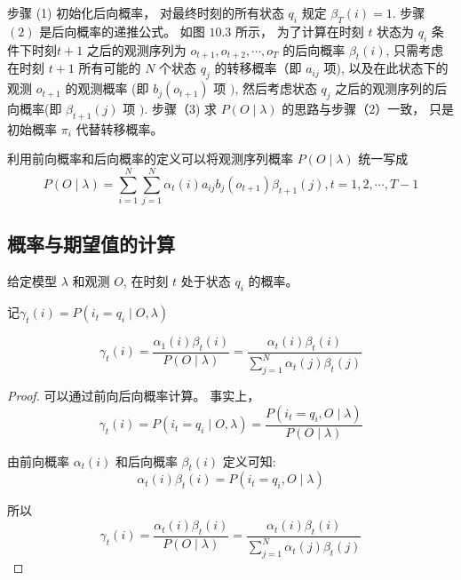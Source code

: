 步骤 (1) 初始化后向概率， 对最终时刻的所有状态 $ q_{i} $ 规定 $ \beta_{T}(i)=1 $. 步骤 $ (2) $ 是后向概率的递推公式。 如图 $ 10.3 $ 所示， 为了计算在时刻 $ t $ 状态为 $ q_{i} $ 条件下时刻$ t+1 $ 之后的观测序列为 $ o_{t+1}, o_{t+2}, \cdots, o_{T} $ 的后向概率 $ \beta_{t}(i) $, 只需考虑在时刻 $ t+1 $ 所有可能的 $ N $ 个状态 $ q_{j} $ 的转移概率（即 $ a_{i j} $ 项), 以及在此状态下的观测 $ o_{t+1} $ 的观测概率 (即 $ b_{j}\left(o_{t+1}\right) $ 项 $ ) $, 然后考虑状态 $ q_{j} $ 之后的观测序列的后向概率(即 $ \beta_{t+1}(j) $ 项 $ ) $. 步骤（3) 求 $ P(O \mid \lambda) $ 的思路与步骤（2）一致， 只是初始概率 $ \pi_{i} $ 代替转移概率。

利用前向概率和后向概率的定义可以将观测序列概率 $ P(O \mid \lambda) $ 统一写成
\begin{equation}
P(O \mid \lambda)=\sum_{i=1}^{N} \sum_{j=1}^{N} \alpha_{t}(i) a_{i j} b_{j}\left(o_{t+1}\right) \beta_{t+1}(j), t=1,2, \cdots, T-1
\end{equation}

\subsection{概率与期望值的计算}

\begin{theorem}
    \label{Thm:ComputeGamma}
    给定模型 $ \lambda $ 和观测 $ O $, 在时刻 $ t $ 处于状态 $ q_{i} $ 的概率。 
    
    记$ \gamma_{t}(i)=P\left(i_{t}=q_{i} \mid O, \lambda\right) $

\begin{equation} \gamma_{t}(i)=\frac{\alpha_{1}(i) \beta_{t}(i)}{P(O \mid \lambda)}=\frac{\alpha_{t}(i) \beta_{t}(i)}{\sum_{j=1}^{N} \alpha_{t}(j) \beta_{t}(j)} \end{equation}
\end{theorem}


\begin{proof}
    可以通过前向后向概率计算。 事实上，
\begin{equation}
\gamma_{t}(i)=P\left(i_{t}=q_{i} \mid O, \lambda\right)=\frac{P\left(i_{t}=q_{i}, O \mid \lambda\right)}{P(O \mid \lambda)}
\end{equation}

由前向概率 $ \alpha_{t}(i) $ 和后向概率 $ \beta_{t}(i) $ 定义可知:
\begin{equation}
\alpha_{t}(i) \beta_{t}(i)=P\left(i_{t}=q_{i}, O \mid \lambda\right)
\end{equation}

所以
\begin{equation} \gamma_{t}(i)=\frac{\alpha_{t}(i) \beta_{t}(i)}{P(O \mid \lambda)}=\frac{\alpha_{t}(i) \beta_{t}(i)}{\sum_{j=1}^{N} \alpha_{t}(j) \beta_{t}(j)} \end{equation}
\end{proof}


